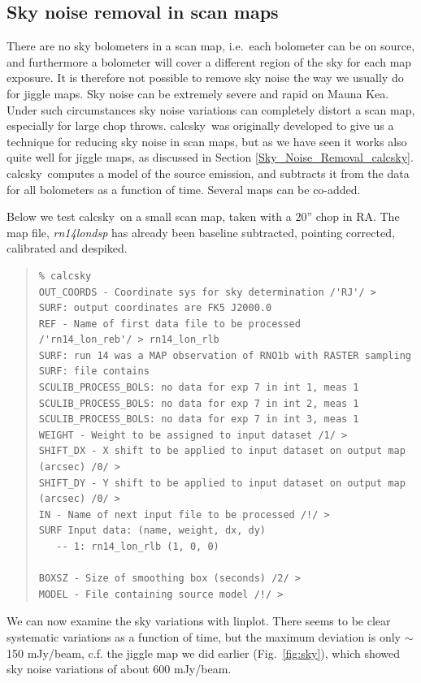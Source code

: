 \documentclass[twoside,11pt]{article}
\newenvironment{myquote}{\begin{quote}\begin{small}}{\end{small}\end{quote}}
\newcommand{\task}[1]{\textsf{#1}}
\newcommand{\calcsky}{\xref{\task{calcsky}}{sun216}{CALCSKY}}
\newcommand{\linplot}{\xref{\task{linplot}}{sun95}{LINPLOT}}
\newcommand{\xref}[3]{#1}
\newcommand{\xlabel}[1]{}
\renewcommand{\_}{\texttt{\symbol{95}}}
\begin{document}
\subsection{\xlabel{scan_maps_calcsky}Sky noise removal in scan maps
\label{scan_maps_calcsky}}

There are no sky bolometers in a scan map, i.e.\ each bolometer can be
on source, and furthermore a bolometer will cover a different region
of the sky for each map exposure.  It is therefore not possible to
remove sky noise the way we usually do for jiggle maps.  Sky noise can
be extremely severe and rapid on Mauna Kea.  Under such circumstances
sky noise variations can completely distort a scan map, especially for
large chop throws.  \calcsky\ was originally developed to give us a
technique for reducing sky noise in scan maps, but as we have seen it
works also quite well for jiggle maps, as discussed in Section
\ref{Sky_Noise_Removal_calcsky}.  \calcsky\ computes a model of the
source emission, and subtracts it from the data for all bolometers as
a function of time. Several maps can be co-added.


Below we test \calcsky\ on a small scan map, taken with a 20'' chop
in RA.  The map file, {\it rn14\_lon\_dsp} has already been baseline
subtracted, pointing corrected, calibrated and despiked.


\begin{myquote}
\begin{verbatim}
% calcsky
OUT_COORDS - Coordinate sys for sky determination /'RJ'/ >
SURF: output coordinates are FK5 J2000.0
REF - Name of first data file to be processed
/'rn14_lon_reb'/ > rn14_lon_rlb
SURF: run 14 was a MAP observation of RNO1b with RASTER sampling
SURF: file contains
SCULIB_PROCESS_BOLS: no data for exp 7 in int 1, meas 1
SCULIB_PROCESS_BOLS: no data for exp 7 in int 2, meas 1
SCULIB_PROCESS_BOLS: no data for exp 7 in int 3, meas 1
WEIGHT - Weight to be assigned to input dataset /1/ >
SHIFT_DX - X shift to be applied to input dataset on output map
(arcsec) /0/ >
SHIFT_DY - Y shift to be applied to input dataset on output map
(arcsec) /0/ >
IN - Name of next input file to be processed /!/ >
SURF Input data: (name, weight, dx, dy)
   -- 1: rn14_lon_rlb (1, 0, 0)

BOXSZ - Size of smoothing box (seconds) /2/ >
MODEL - File containing source model /!/ >
\end{verbatim}
\end{myquote}

We can now examine the sky variations with \linplot. There seems to be
clear systematic variations as a function of time, but the maximum
deviation is only $\sim$ 150 mJy/beam, c.f. the jiggle map we did
earlier (Fig.\ \ref{fig:sky}), which showed sky noise variations of
about 600 mJy/beam.
\end{document}
